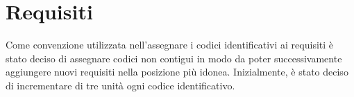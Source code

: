 \section{Requisiti}{
	Come convenzione utilizzata nell'assegnare i codici identificativi ai requisiti è stato deciso di assegnare codici non contigui in modo da poter successivamente aggiungere nuovi requisiti nella posizione più idonea. Inizialmente, è stato deciso di incrementare di tre unità ogni codice identificativo.\\
	
	\newpage
	
	\newpage
	
}